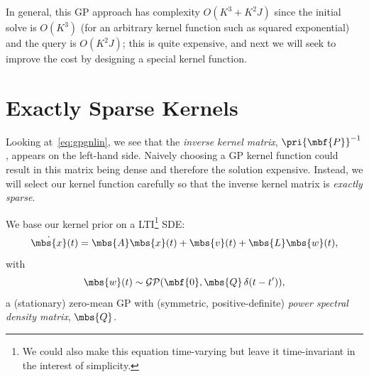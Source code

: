In general, this  \ac{GP} approach has complexity $O(K^3 + K^2J)$ since the initial solve is $O(K^3)$ (for an arbitrary kernel function such as squared exponential) and the query is $O(K^2J)$; this is quite expensive, and next we will seek to improve the cost by designing a special kernel function.

\section{Exactly Sparse Kernels}

Looking at~\eqref{eq:gpgnlin}, we see that the {\em inverse kernel matrix}, $\pri{\mbf{P}}^{-1}$, appears on the left-hand side.  Naively choosing a \ac{GP} kernel function could result in this matrix being dense and therefore the solution expensive.  Instead, we will select our kernel function carefully so that the inverse kernel matrix is {\em exactly sparse}.

We base our kernel prior on a \ac{LTI}\footnote{We could also make this equation time-varying \citep{barfoot_ser24} but leave it time-invariant in the interest of simplicity.} \acf{SDE}:
\begin{equation}
\dot{\mbs{x}}(t) = \mbs{A} \mbs{x}(t) + \mbs{v}(t) + \mbs{L} \mbs{w}(t),
\end{equation}
with
\begin{equation}
\mbs{w}(t) \sim \mathcal{GP}(\mbf{0}, \mbs{Q} \, \delta(t-t^\prime)),
\end{equation}
a (stationary) zero-mean  \ac{GP} with (symmetric, positive-definite)  {\em power spectral density matrix}, $\mbs{Q}$.

